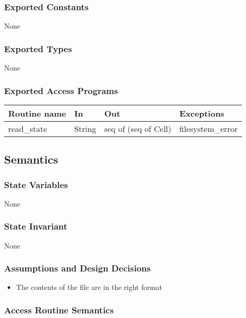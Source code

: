 \documentclass[12pt]{article}
\begin{document}
\subsubsection* {Exported Constants}

None

\subsubsection* {Exported Types}

None

\subsubsection* {Exported Access Programs}

\begin{tabular}{| l | l | l | p{5cm} |}
\hline
\textbf{Routine name} & \textbf{In} & \textbf{Out} & \textbf{Exceptions}\\
\hline
read\_state & String & seq of (seq of Cell) & filesystem\_error\\
\hline
\end{tabular}

\subsection* {Semantics}

\subsubsection* {State Variables}

None

\subsubsection* {State Invariant}

None

\subsubsection* {Assumptions and Design Decisions}

\begin{itemize}
    \item The contents of the file are in the right format
\end{itemize}

\subsubsection* {Access Routine Semantics}
\end{document}
